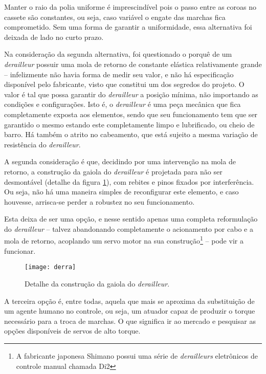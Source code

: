 \documentclass[a4paper,11pt]{article}
\begin{document}
Manter o raio da polia uniforme é imprescindível pois o passo entre as coroas
no cassete são constantes, ou seja, caso variável o engate das marchas fica
comprometido. Sem uma forma de garantir a uniformidade, essa alternativa foi
deixada de lado no curto prazo.

Na consideração da segunda alternativa, foi questionado o porquê de um
\textit{derailleur} possuir uma mola de retorno de constante elástica
relativamente grande -- infelizmente não havia forma de medir seu valor, e não
há especificação disponível pelo fabricante, visto que constitui um dos
segredos do projeto. O valor é tal que possa garantir do \textit{derailleur} a
posição mínima, não importando as condições e configurações. Isto é, o
\textit{derailleur} é uma peça mecânica que fica completamente exposta aos
elementos, sendo que seu funcionamento tem que ser garantido o mesmo estando
este completamente limpo e lubrificado, ou cheio de barro. Há também o atrito no
cabeamento, que está sujeito a mesma variação de resistência do
\textit{derailleur}.

A segunda consideração é que, decidindo por uma intervenção na mola de retorno,
a construção da gaiola do \textit{derailleur} é projetada para não ser
desmontável (detalhe da figura \ref{fig:derra}), com rebites e pinos
fixados por interferência. Ou seja, não há uma maneira simples de reconfigurar
este elemento, e caso houvesse, arrisca-se perder a robustez no seu
funcionamento.

Esta deixa de ser uma opção, e nesse sentido apenas uma completa
reformulação do \textit{derailleur} -- talvez abandonando completamente o
acionamento por cabo e a mola de retorno, acoplando um servo motor na sua
construção\footnote{A fabricante japonesa Shimano possui uma série de
\textit{derailleurs} eletrônicos de controle manual chamada Di2} -- pode vir a
funcionar.

\begin{figure}[ht!]
\begin{center}
 \texttt{[image: derra]}
\end{center}
  \caption{Detalhe da construção da gaiola do \textit{derailleur}.}
  \label{fig:derra}
\end{figure}

A terceira opção é, entre todas, aquela que mais se aproxima da substituição de
um agente humano no controle, ou seja, um atuador capaz de produzir o torque
necessário para a troca de marchas. O que significa ir ao mercado e pesquisar
as opções disponíveis de servos de alto torque.
\end{document}
